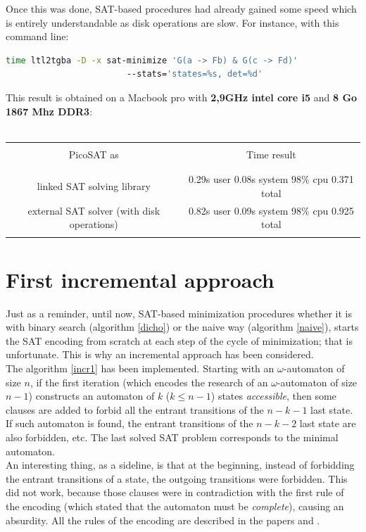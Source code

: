 Once this was done, SAT-based procedures had already gained some speed which is entirely understandable as
disk operations are slow. For instance, with this command
line:
\begin{lstlisting}[language=bash,caption={bash command-line to test a formula minimization using ltl2tgba}]
  time ltl2tgba -D -x sat-minimize 'G(a -> Fb) & G(c -> Fd)'
                        --stats='states=%s, det=%d'
\end{lstlisting}
This result is obtained on a Macbook pro with \textbf{2,9GHz intel core i5} and
\textbf{8 Go 1867 Mhz DDR3}:\\\\
\begin{tabular}{|c|c|}
 \hline
 &\\
 PicoSAT as & Time result\\
 &\\
 \hline
 &\\
 linked SAT solving library&0.29s user 0.08s system 98\% cpu 0.371 total\\
 external SAT solver (with disk operations)&0.82s user 0.09s system 98\% cpu 0.925 total\\
 &\\
 \hline
\end{tabular}

\section{First incremental approach}
\label{approach1}
Just as a reminder, until now, SAT-based minimization procedures whether it is with binary search
(algorithm \ref{dicho}) or the naive way (algorithm \ref{naive}), starts the SAT encoding from scratch
at each step of the cycle of minimization; that is unfortunate. This is why an incremental approach
has been considered.\\

\noindent  The algorithm \ref{incr1} has been implemented. Starting with an $\omega$-automaton of size
$n$, if the first iteration (which encodes the research of an $\omega$-automaton of size $n-1$) constructs
an automaton of $k$ ($k \leq n-1$) states \textit{accessible}, then some clauses are added to forbid all the
entrant transitions of the $n-k-1$ last state. If such automaton is found, the entrant transitions of the
$n-k-2$ last state are also forbidden, etc. The last solved SAT problem corresponds to the minimal
automaton.\\

\noindent An interesting thing, as a sideline, is that at the beginning, instead of forbidding the entrant
transitions of a state, the outgoing transitions were forbidden. This did not work, because those
clauses were in contradiction with the first rule of the encoding (which stated that the automaton must be
\textit{complete}), causing an absurdity. All the rules of the encoding are described in the papers
\cite{14} and \cite{15}.\\

